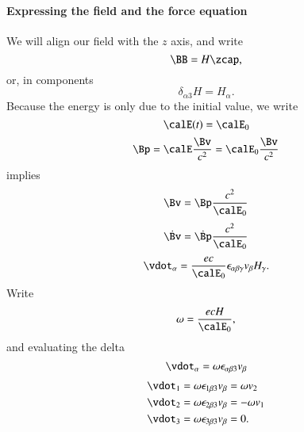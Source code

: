 {\paragraph{Expressing the field and the force equation}
%
We will align our field with the \(z\) axis, and write
%
\begin{equation}\label{eqn:relativisticElectrodynamicsT3:560}
\BB = H \zcap,
\end{equation}
%
or, in components
%
\begin{equation}\label{eqn:relativisticElectrodynamicsT3:580}
\delta_{\alpha 3} H = H_\alpha.
\end{equation}
%
Because the energy is only due to the initial value, we write
%
\begin{equation}\label{eqn:relativisticElectrodynamicsT3:540}
\calE(t) = \calE_0
\end{equation}
%
\begin{equation}\label{eqn:relativisticElectrodynamicsT3:600}
\Bp = \calE \frac{\Bv}{c^2} = \calE_0 \frac{\Bv}{c^2}
\end{equation}
%
implies
%
\begin{equation}\label{eqn:relativisticElectrodynamicsT3:620}
\Bv = \Bp \frac{c^2}{\calE_0}
\end{equation}
%
\begin{equation}\label{eqn:relativisticElectrodynamicsT3:640}
\dot{\Bv} = \dot{\Bp} \frac{c^2}{\calE_0}
\end{equation}
%
\begin{equation}\label{eqn:relativisticElectrodynamicsT3:660}
\vdot_\alpha = \frac{e c}{\calE_0} \epsilon_{\alpha \beta \gamma} v_\beta H_\gamma.
\end{equation}
%
Write
%
\begin{equation}\label{eqn:relativisticElectrodynamicsT3:680}
\omega = \frac{e c H}{\calE_0},
\end{equation}
and evaluating the delta
\begin{equation}\label{eqn:relativisticElectrodynamicsT3:700}
\vdot_\alpha = \omega \epsilon_{\alpha \beta 3} v_\beta
\end{equation}
%
\begin{equation}\label{eqn:relativisticElectrodynamicsT3:720}
\begin{aligned}
\vdot_1 &= \omega \epsilon_{1 \beta 3} v_\beta = \omega v_2 \\
\vdot_2 &= \omega \epsilon_{2 \beta 3} v_\beta = - \omega v_1 \\
\vdot_3 &= \omega \epsilon_{3 \beta 3} v_\beta = 0.

\end{aligned}
\end{equation}}
